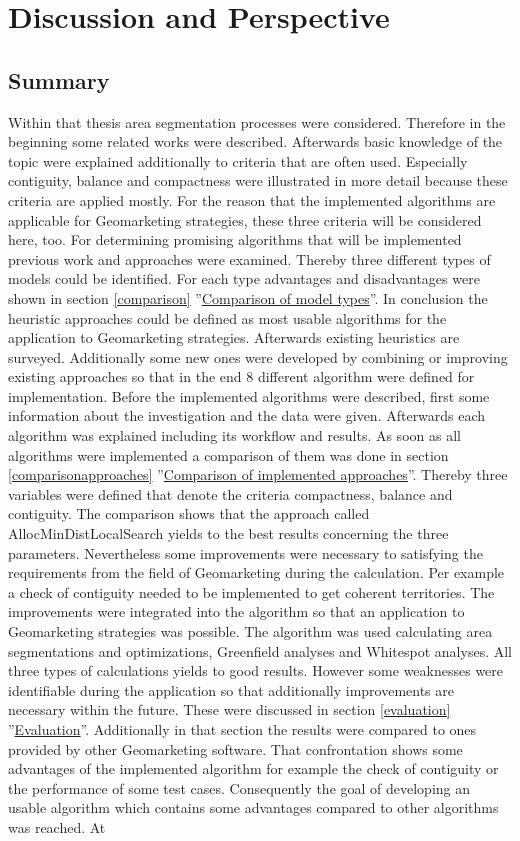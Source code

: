 \section{Discussion and Perspective}
\subsection{Summary}

Within that thesis area segmentation processes were considered. Therefore in the beginning some related works were described. Afterwards basic knowledge of the topic were explained additionally to criteria that are often used. Especially contiguity, balance and compactness were illustrated in more detail because these criteria are applied mostly. For the reason that the implemented algorithms are applicable for Geomarketing strategies, these three criteria will be considered here, too. For determining promising algorithms that will be implemented previous work and approaches were examined. Thereby three different types of models could be identified. For each type advantages and disadvantages were shown in section \ref{comparison} ''\hyperref[comparison]{Comparison of model types}''. In conclusion the heuristic approaches could be defined as most usable algorithms for the application to Geomarketing strategies. Afterwards existing heuristics are surveyed. Additionally some new ones were developed by combining or improving existing approaches so that in the end 8 different algorithm were defined for implementation. Before the implemented algorithms were described, first some information about the investigation and the data were given. Afterwards each algorithm was explained including its workflow and results. As soon as all algorithms were implemented a comparison of them was done in section \ref{comparisonapproaches} ''\hyperref[comparisonapproaches]{Comparison of implemented approaches}''. Thereby three variables were defined that denote the criteria compactness, balance and contiguity. The comparison shows that the approach called AllocMinDistLocalSearch yields to the best results concerning the three parameters. Nevertheless some improvements were necessary to satisfying the requirements from the field of Geomarketing during the calculation. Per example a check of contiguity needed to be implemented to get coherent territories. The improvements were integrated into the algorithm so that an application to Geomarketing strategies was possible. The algorithm was used calculating area segmentations and optimizations, Greenfield analyses and Whitespot analyses. All three types of calculations yields to good results. However some weaknesses were identifiable during the application so that additionally improvements are necessary within the future. These were discussed in section \ref{evaluation} ''\hyperref[evaluation]{Evaluation}''. Additionally in that section the results were compared to ones provided by other Geomarketing software. That confrontation shows some advantages of the implemented algorithm for example the check of contiguity or the performance of some test cases. Consequently the goal of developing an usable algorithm which contains some advantages compared to other algorithms was reached. At 